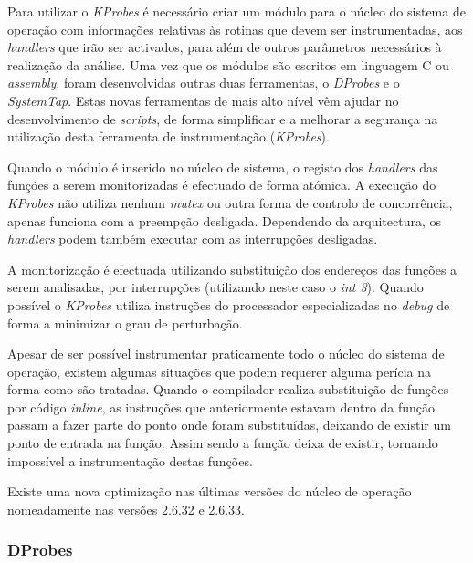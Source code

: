 Para utilizar o \textit{KProbes} é necessário criar um módulo para o núcleo do sistema de operação com informações relativas às rotinas que devem ser instrumentadas, aos \textit{handlers} que irão ser activados, para além de outros parâmetros necessários à realização da análise. Uma vez que os módulos são escritos em linguagem C ou \textit{assembly}, foram desenvolvidas outras duas ferramentas, o \textit{DProbes} e o \textit{SystemTap}. Estas novas ferramentas de mais alto nível vêm ajudar no desenvolvimento de \textit{scripts}, de forma simplificar e a melhorar a segurança na utilização desta ferramenta de instrumentação (\textit{KProbes}).

Quando o módulo é inserido no núcleo de sistema, o registo dos \textit{handlers} das funções a serem monitorizadas é efectuado de forma atómica. A execução do \textit{KProbes} não utiliza nenhum \textit{mutex} ou outra forma de controlo de concorrência, apenas funciona com a preempção desligada. Dependendo da arquitectura, os \textit{handlers} podem também executar com as interrupções desligadas.

A monitorização é efectuada utilizando substituição dos endereços das funções a serem analisadas, por interrupções (utilizando neste caso o \textit{int 3}). Quando possível o \textit{KProbes} utiliza instruções do processador especializadas no \textit{debug} de forma a minimizar o grau de perturbação. 

Apesar de ser possível instrumentar praticamente todo o núcleo do sistema de operação, existem algumas situações que podem requerer alguma perícia na forma como são tratadas. Quando o compilador realiza substituição de funções por código \textit{inline}, as instruções que anteriormente estavam dentro da função passam a fazer parte do ponto onde foram substituídas, deixando de existir um ponto de entrada na função. Assim sendo a função deixa de existir, tornando impossível a instrumentação destas funções.

Existe uma nova optimização nas últimas versões do núcleo de operação nomeadamente nas versões 2.6.32 e 2.6.33.


\subsubsection{DProbes}\label{cap:Dprobe_overview}

